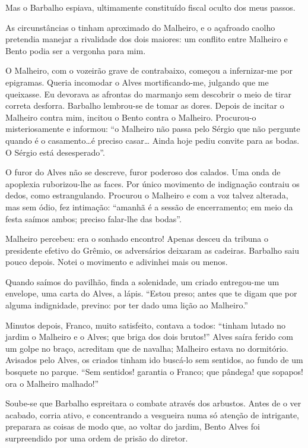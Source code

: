 Mas o Barbalho espiava, ultimamente constituído fiscal
oculto dos meus passos.

As circunstâncias o tinham aproximado do Malheiro, e o açafroado caolho
pretendia manejar a rivalidade dos dois maiores: um conflito entre
Malheiro e Bento podia ser a vergonha para mim. 

O Malheiro, com o
vozeirão grave de contrabaixo, começou a infernizar{}-me por epigramas.
Queria incomodar o Alves mortificando{}-me, julgando que me queixasse.
Eu devorava as afrontas do marmanjo sem descobrir o meio de tirar
correta desforra. Barbalho lembrou{}-se de tomar as dores. Depois de
incitar o Malheiro contra mim, incitou o Bento contra o Malheiro.
Procurou{}-o misteriosamente e informou: ``o Malheiro não passa pelo
Sérgio que não pergunte quando é o casamento\ldots é preciso casar\ldots
Ainda hoje pediu convite para as bodas. O Sérgio está desesperado''.

O furor do Alves não se descreve, furor poderoso dos calados. Uma onda de
apoplexia ruborizou{}-lhe as faces. Por único movimento de indignação
contraiu os dedos, como estrangulando. Procurou o Malheiro e com a voz
talvez alterada, mas sem ódio, fez intimação: ``amanhã é a sessão de
encerramento; em meio da festa saímos ambos; preciso falar{}-lhe das
bodas''. 

Malheiro percebeu: era o sonhado encontro! Apenas desceu da
tribuna o presidente efetivo do Grêmio, os adversários deixaram as
cadeiras. Barbalho saiu pouco depois. Notei o movimento e adivinhei
mais ou menos. 

Quando saímos do pavilhão, finda a solenidade, um criado
entregou{}-me um envelope, uma carta do Alves, a lápis. ``Estou preso;
antes que te digam que por alguma indignidade, previno: por ter dado
uma lição ao Malheiro.'' 

Minutos depois, Franco, muito satisfeito,
contava a todos: ``tinham lutado no jardim o Malheiro e o Alves; que
briga dos dois brutos!'' Alves saíra ferido com um golpe no braço,
acreditam que de navalha; Malheiro estava no dormitório. Avisados pelo
Alves, os criados tinham ido buscá{}-lo sem sentidos, ao fundo de um
bosquete no parque. ``Sem sentidos! garantia o Franco; que pândega! que
sopapos! ora o Malheiro malhado!'' 

Soube{}-se que Barbalho espreitara o
combate através dos arbustos. Antes de o ver acabado, corria ativo, e
concentrando a vesgueira numa só atenção de intrigante, preparara as
coisas de modo que, ao voltar do jardim, Bento Alves foi surpreendido
por uma ordem de prisão do diretor. 


